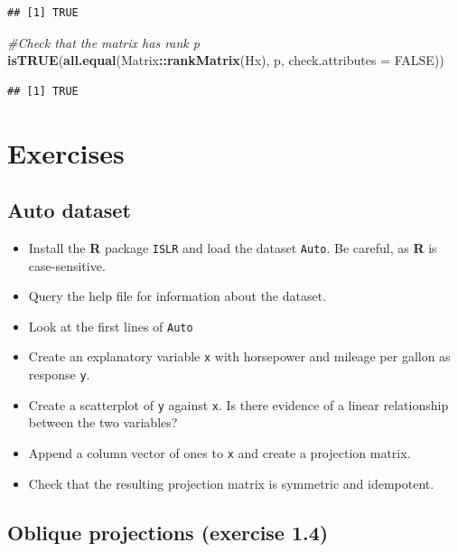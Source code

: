 \documentclass[]{book}
\newenvironment{Shaded}{\begin{snugshade}}{\end{snugshade}}
\newcommand{\KeywordTok}[1]{\textcolor[rgb]{0.13,0.29,0.53}{\textbf{#1}}}
\newcommand{\DataTypeTok}[1]{\textcolor[rgb]{0.13,0.29,0.53}{#1}}
\newcommand{\CommentTok}[1]{\textcolor[rgb]{0.56,0.35,0.01}{\textit{#1}}}
\newcommand{\OtherTok}[1]{\textcolor[rgb]{0.56,0.35,0.01}{#1}}
\newcommand{\OperatorTok}[1]{\textcolor[rgb]{0.81,0.36,0.00}{\textbf{#1}}}
\newcommand{\NormalTok}[1]{#1}
\providecommand{\tightlist}{%
  \setlength{\itemsep}{0pt}\setlength{\parskip}{0pt}}
\theoremstyle{definition}
\theoremstyle{definition}
\theoremstyle{definition}
\theoremstyle{remark}
\begin{document}
\begin{verbatim}
## [1] TRUE
\end{verbatim}

\begin{Shaded}
\begin{Highlighting}[]
\CommentTok{#Check that the matrix has rank p}
\KeywordTok{isTRUE}\NormalTok{(}\KeywordTok{all.equal}\NormalTok{(Matrix}\OperatorTok{::}\KeywordTok{rankMatrix}\NormalTok{(Hx), p, }\DataTypeTok{check.attributes =} \OtherTok{FALSE}\NormalTok{))}
\end{Highlighting}
\end{Shaded}

\begin{verbatim}
## [1] TRUE
\end{verbatim}

\section{Exercises}\label{exercises}

\subsection{Auto dataset}\label{auto-dataset}

\begin{itemize}
\tightlist
\item
  Install the \textbf{R} package \texttt{ISLR} and load the dataset
  \texttt{Auto}. Be careful, as \textbf{R} is case-sensitive.
\item
  Query the help file for information about the dataset.
\item
  Look at the first lines of \texttt{Auto}
\item
  Create an explanatory variable \texttt{x} with horsepower and mileage
  per gallon as response \texttt{y}.
\item
  Create a scatterplot of \texttt{y} against \texttt{x}. Is there
  evidence of a linear relationship between the two variables?
\item
  Append a column vector of ones to \texttt{x} and create a projection
  matrix.
\item
  Check that the resulting projection matrix is symmetric and
  idempotent.
\end{itemize}

\subsection{Oblique projections (exercise
1.4)}\label{oblique-projections-exercise-1.4}
\end{document}
